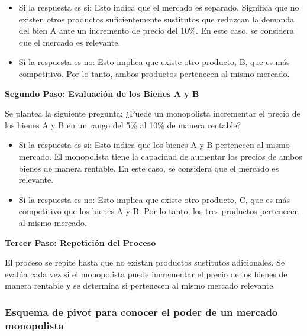 \documentclass[
  a4paper,
]{article}
\begin{document}
\begin{itemize}
\item
  Si la respuesta es sí: Esto indica que el mercado es separado.
  Significa que no existen otros productos suficientemente sustitutos
  que reduzcan la demanda del bien A ante un incremento de precio del
  10\%. En este caso, se considera que el mercado es relevante.
\item
  Si la respuesta es no: Esto implica que existe otro producto, B, que
  es más competitivo. Por lo tanto, ambos productos pertenecen al mismo
  mercado.
\end{itemize}

\textbf{Segundo Paso: Evaluación de los Bienes A y B}

Se plantea la siguiente pregunta: ¿Puede un monopolista incrementar el
precio de los bienes A y B en un rango del 5\% al 10\% de manera
rentable?

\begin{itemize}
\item
  Si la respuesta es sí: Esto indica que los bienes A y B pertenecen al
  mismo mercado. El monopolista tiene la capacidad de aumentar los
  precios de ambos bienes de manera rentable. En este caso, se considera
  que el mercado es relevante.
\item
  Si la respuesta es no: Esto implica que existe otro producto, C, que
  es más competitivo que los bienes A y B. Por lo tanto, los tres
  productos pertenecen al mismo mercado.
\end{itemize}

\textbf{Tercer Paso: Repetición del Proceso}

El proceso se repite hasta que no existan productos sustitutos
adicionales. Se evalúa cada vez si el monopolista puede incrementar el
precio de los bienes de manera rentable y se determina si pertenecen al
mismo mercado relevante.

\hypertarget{esquema-de-pivot-para-conocer-el-poder-de-un-mercado-monopolista}{%
\subsubsection{Esquema de pivot para conocer el poder de un mercado
monopolista}\label{esquema-de-pivot-para-conocer-el-poder-de-un-mercado-monopolista}}
\end{document}
